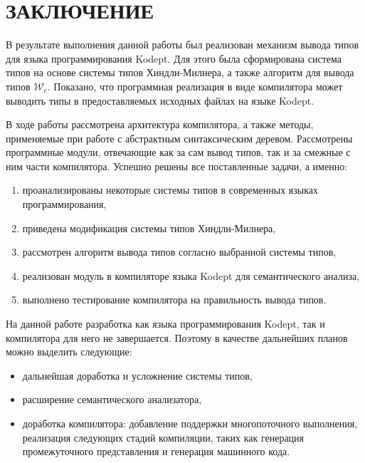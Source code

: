\chapter*{ЗАКЛЮЧЕНИЕ}
\label{ch:conclusion}

В результате выполнения данной работы был реализован механизм вывода типов для языка программирования Kodept.
Для этого была сформирована система типов на основе системы типов Хиндли-Милнера, а также алгоритм для вывода типов $\mathcal{W}_c$.
Показано, что программная реализация в виде компилятора может выводить типы в предоставляемых исходных файлах на языке Kodept.

В ходе работы рассмотрена архитектура компилятора, а также методы, применяемые при работе с абстрактным синтаксическим деревом.
Рассмотрены программные модули, отвечающие как за сам вывод типов, так и за смежные с ним части компилятора.
Успешно решены все поставленные задачи, а именно:
\begin{enumerate}[1)]
    \item проанализированы некоторые системы типов в современных языках программирования,
    \item приведена модификация системы типов Хиндли-Милнера,
    \item рассмотрен алгоритм вывода типов согласно выбранной системы типов,
    \item реализован модуль в компиляторе языка Kodept для семантического анализа,
    \item выполнено тестирование компилятора на правильность вывода типов.
\end{enumerate}

На данной работе разработка как языка программирования Kodept, так и компилятора для него не завершается.
Поэтому в качестве дальнейших планов можно выделить следующие:
\begin{itemize}
    \item дальнейшая доработка и усложнение системы типов,
    \item расширение семантического анализатора,
    \item доработка компилятора: добавление поддержки многопоточного выполнения, реализация следующих стадий компиляции, таких как генерация промежуточного представления и генерация машинного кода.
\end{itemize}

